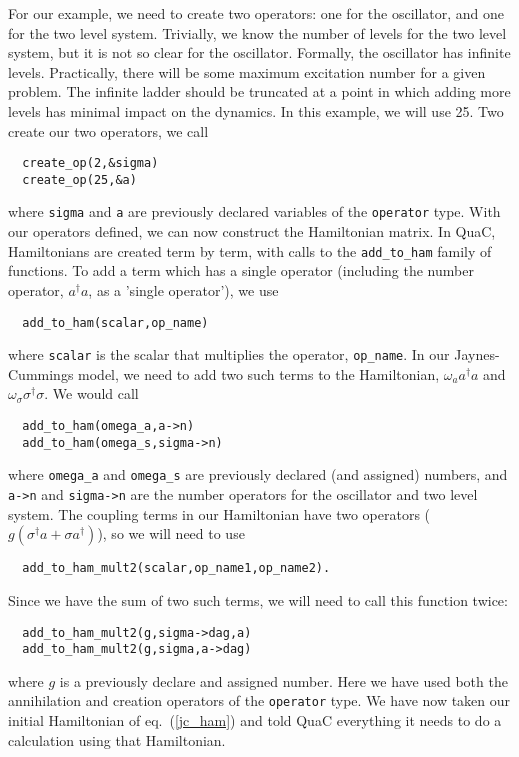 \documentclass{article}
\begin{document}
For our example, we need to create two operators: one for the oscillator, and one
for the two level system. Trivially, we know the number of levels for the two level system, but
it is not so clear for the oscillator. Formally, the oscillator has infinite levels. Practically,
there will be some maximum excitation number for a given problem. The infinite ladder
should be truncated at a point in which adding more levels has minimal impact on the
dynamics. In this example, we will use 25. Two create our two operators, we call
\begin{lstlisting}
  create_op(2,&sigma)
  create_op(25,&a)
\end{lstlisting}
where \texttt{sigma} and \texttt{a} are previously declared variables of the \texttt{operator} type.
With our operators defined, we can now construct the Hamiltonian matrix. In QuaC, Hamiltonians
are created term by term, with calls to the \texttt{add\_to\_ham} family of functions. To add
a term which has a single operator (including the number operator, $a^\dagger a$, as a
'single operator'), we use
\begin{lstlisting}
  add_to_ham(scalar,op_name)
\end{lstlisting}
where \texttt{scalar} is the scalar that multiplies the operator, \texttt{op\_name}. In our
Jaynes-Cummings model, we need to add two such terms to the Hamiltonian,
$\omega_a a^\dagger a$ and $\omega_\sigma \sigma^\dagger \sigma$. We would call
\begin{lstlisting}
  add_to_ham(omega_a,a->n)
  add_to_ham(omega_s,sigma->n)
\end{lstlisting}
where \texttt{omega\_a} and \texttt{omega\_s} are previously declared (and assigned) numbers,
and \texttt{a->n} and \texttt{sigma->n} are the number operators for the oscillator
and two level system.
The coupling terms in our Hamiltonian have two operators
($g (\sigma^\dagger a + \sigma a^\dagger)$), so we will need to use
\begin{lstlisting}
  add_to_ham_mult2(scalar,op_name1,op_name2).
\end{lstlisting}
Since we have the sum of two such terms, we will need to call this function twice:
\begin{lstlisting}
  add_to_ham_mult2(g,sigma->dag,a)
  add_to_ham_mult2(g,sigma,a->dag)
\end{lstlisting}
where $g$ is a previously declare and assigned number. Here we have used both the
annihilation and creation operators of the \texttt{operator} type. We have now taken
our initial Hamiltonian of eq.~(\ref{jc_ham}) and told QuaC everything it needs
to do a calculation using that Hamiltonian. 
\end{document}
